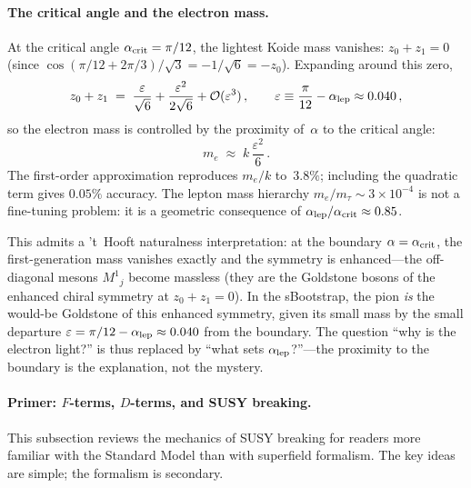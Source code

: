 \documentclass[12pt,a4paper]{article}
\begin{document}
\paragraph{The critical angle and the electron mass.}
At the critical angle $\alpha_{\rm crit} = \pi/12$, the lightest Koide
mass vanishes: $z_0 + z_1 = 0$ (since $\cos(\pi/12 + 2\pi/3)/\sqrt{3}
= -1/\sqrt{6} = -z_0$).  Expanding around this zero,
\begin{equation}
  z_0 + z_1 \;=\; \frac{\varepsilon}{\sqrt{6}}
    + \frac{\varepsilon^2}{2\sqrt{6}} + \mathcal{O}(\varepsilon^3)\,,
  \qquad
  \varepsilon \equiv \frac{\pi}{12} - \alpha_{\rm lep}
  \approx 0.040\,,
  \label{eq:eps_crit}
\end{equation}
so the electron mass is controlled by the proximity of~$\alpha$ to the
critical angle:
\begin{equation}
  m_e \;\approx\; k\,\frac{\varepsilon^2}{6}\,.
  \label{eq:me_crit}
\end{equation}
The first-order approximation reproduces $m_e/k$ to~$3.8\%$;
including the quadratic term gives $0.05\%$ accuracy.
The lepton mass hierarchy $m_e/m_\tau \sim 3\times 10^{-4}$ is not a
fine-tuning problem: it is a geometric consequence of
$\alpha_{\rm lep}/\alpha_{\rm crit} \approx 0.85$.

This admits a 't~Hooft naturalness interpretation: at the
boundary $\alpha = \alpha_{\rm crit}$, the first-generation mass
vanishes exactly and the symmetry is enhanced---the off-diagonal
mesons $M^1{}_j$ become massless (they are the Goldstone bosons
of the enhanced chiral symmetry at $z_0 + z_1 = 0$).
In the sBootstrap, the pion \emph{is} the would-be Goldstone
of this enhanced symmetry, given its small mass by the small
departure $\varepsilon = \pi/12 - \alpha_{\rm lep} \approx 0.040$
from the boundary.
The question ``why is the electron light?'' is thus replaced by
``what sets $\alpha_{\rm lep}$?''---the proximity to the boundary is
the explanation, not the mystery.

\paragraph{Primer: $F$-terms, $D$-terms, and SUSY breaking.}
This subsection reviews the mechanics of SUSY breaking for
readers more familiar with the Standard Model than with
superfield formalism. The key ideas are simple; the formalism
is secondary.
\end{document}
